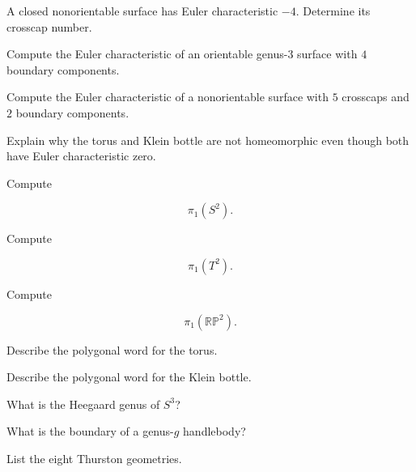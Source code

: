 \begin{exercise}[2]
A closed nonorientable surface has Euler characteristic \(-4\). Determine
its crosscap number.
\end{exercise}

\begin{exercise}[2]
Compute the Euler characteristic of an orientable genus-\(3\) surface with
\(4\) boundary components.
\end{exercise}

\begin{exercise}[2]
Compute the Euler characteristic of a nonorientable surface with \(5\)
crosscaps and \(2\) boundary components.
\end{exercise}

\begin{exercise}[2]
Explain why the torus and Klein bottle are not homeomorphic even though both
have Euler characteristic zero.
\end{exercise}

\begin{exercise}[2]
Compute

\[
\pi_1(S^2).
\]
\end{exercise}

\begin{exercise}[2]
Compute

\[
\pi_1(T^2).
\]
\end{exercise}

\begin{exercise}[2]
Compute

\[
\pi_1(\mathbb{RP}^2).
\]
\end{exercise}

\begin{exercise}[2]
Describe the polygonal word for the torus.
\end{exercise}

\begin{exercise}[2]
Describe the polygonal word for the Klein bottle.
\end{exercise}

\begin{exercise}[2]
What is the Heegaard genus of \(S^3\)?
\end{exercise}

\begin{exercise}[2]
What is the boundary of a genus-\(g\) handlebody?
\end{exercise}

\begin{exercise}[2]
List the eight Thurston geometries.
\end{exercise}

